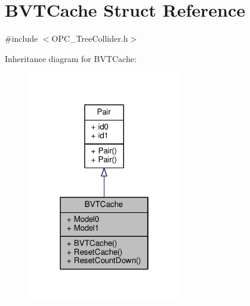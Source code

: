 \hypertarget{structBVTCache}{}\section{B\+V\+T\+Cache Struct Reference}
\label{structBVTCache}


{\ttfamily \#include $<$O\+P\+C\+\_\+\+Tree\+Collider.\+h$>$}



Inheritance diagram for B\+V\+T\+Cache\+:
\nopagebreak
\begin{figure}[H]
\begin{center}
\leavevmode
\includegraphics[width=190pt]{d4/dc7/structBVTCache__inherit__graph}
\end{center}
\end{figure}


